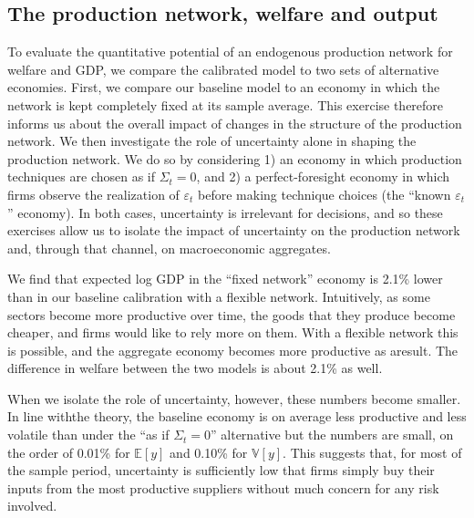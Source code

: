 \documentclass[11pt]{article}
\theoremstyle{definition}
\begin{document}
	\subsection{The production network, welfare and output}
	To evaluate the quantitative potential of an endogenous production network for welfare and GDP, we compare the calibrated model to two sets of alternative economies. First, we compare our baseline model to an economy in which the network is kept completely fixed at its sample average. This exercise therefore informs us about the overall impact of changes in the structure of the production network. We then investigate the role of uncertainty alone in shaping the production network. We do so by considering 1) an economy in which production techniques are chosen as if $\Sigma_t = 0$, and 2) a perfect-foresight economy in which firms observe the realization of $\varepsilon_t$ before making technique choices (the ``known $\varepsilon_t$'' economy). In both cases, uncertainty is irrelevant for decisions, and so these exercises allow us to isolate the impact of uncertainty on the production network and, through that channel, on macroeconomic aggregates.
	
	We find that expected log GDP in the ``fixed network'' economy is 2.1\% lower than in our baseline calibration with a flexible network. Intuitively, as some sectors become more productive over time, the goods that they produce become cheaper, and firms would like to rely more on them. With a flexible network this is possible, and the aggregate economy becomes more productive as aresult. The difference in welfare between the two models is about 2.1\% as well.
	
	When we isolate the role of uncertainty, however, these numbers become smaller. In line withthe theory, the baseline economy is on average less productive and less volatile than under the	``as if $\Sigma_t = 0$'' alternative but the numbers are small, on the order of 0.01\% for $\mathbb{E}[y]$ and 0.10\% for $\mathbb{V}[y]$. This suggests that, for most of the sample period, uncertainty is sufficiently low that firms simply buy their inputs from the most productive suppliers without much concern for any risk involved.
	
\end{document}
